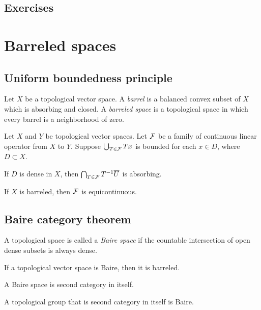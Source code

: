 \documentclass{../../large}
\begin{document}
\begin{prb}
\end{prb}




\section*{Exercises}
\begin{prb}
\end{prb}





\chapter{Barreled spaces}

\section{Uniform boundedness principle}
\begin{prb}
Let $X$ be a topological vector space.
A \emph{barrel} is a balanced convex subset of $X$ which is absorbing and closed.
A \emph{barreled space} is a topological space in which every barrel is a neighborhood of zero.
\end{prb}


\begin{prb}
Let $X$ and $Y$ be topological vector spaces.
Let $\mathcal{F}$ be a family of continuous linear operator from $X$ to $Y$.
Suppose $\bigcup_{T\in\mathcal{F}}Tx$ is bounded for each $x\in D$, where $D\subset X$.
\begin{parts}
\item If $D$ is dense in $X$, then $\bigcap_{T\in\mathcal{F}}T^{-1}\overline U$ is absorbing.
\item If $X$ is barreled, then $\mathcal{F}$ is equicontinuous.
\end{parts}
\end{prb}



\section{Baire category theorem}

\begin{prb}
A topological space is called a \emph{Baire space} if the countable intersection of open dense subsets is always dense.
\begin{parts}
\item If a topological vector space is Baire, then it is barreled.
\item A Baire space is second category in itself.
\item A topological group that is second category in itself is Baire.
\end{parts}
\end{prb}
\end{document}
